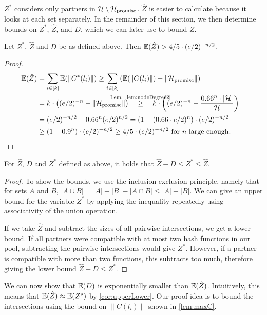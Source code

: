 \documentclass[a4paper,USenglish,cleveref]{lipics-v2021}
\def\refRelLem#1#2{\stackrel{\mathclap{\text{Lem. \ref{#1}}}}{#2}\quad}
\begin{document}
$Z^*$ considers only partners in $\mathcal{H}\setminus\mathcal{H}_{\textrm{promisc}}$.
$\hat Z$ is easier to calculate because it looks at each set separately.
In the remainder of this section, we then determine bounds on $Z^*$, $\hat Z$, and $D$, which we can later use to bound $Z$.

\begin{lemma}
  Let $Z^*$, $\hat Z$ and $D$ be as defined above.
  Then $\mathbb{E}(\hat Z) > 4/5 \cdot (e/2)^{-n/2}$.
  \label{lem:largeZ2}
\end{lemma}
\begin{proof}
  \begin{align*}
    \expect(\hat Z)
     &= \sum_{i \in [k]}\expect(\|C^*(l_i)\|)
     \geq \sum_{i \in [k]}\left(\expect(\|C(l_i)\|) - \|\HProm\|\right)\\
    &= k \cdot \left((e/2)^{-n} - \|\HProm\|\right)
     \quad\refRelLem{lem:nodeDegree2}{\geq} k \cdot \left((e/2)^{-n} - \frac{0.66^n \cdot |\H|}{|\H|}\right)\\
    &= (e/2)^{-n/2} - 0.66^n (e/2)^{n/2}
     = \left(1 - (0.66 \cdot e/2)^n \right) \cdot (e/2)^{-n/2}\\
    & \geq (1-0.9^n) \cdot (e/2)^{-n/2}
      \geq 4/5 \cdot (e/2)^{-n/2} \textrm{ for $n$ large enough.}
    \tag*{\qedhere}
  \end{align*}
\end{proof}

\begin{observation}
  For $\hat Z$, $D$ and $Z^*$ defined as above, it holds that $\hat Z-D \leq Z^* \leq \hat Z$.
  \label{cor:upperLower}
\end{observation}
\begin{proof}
  To show the bounds, we use the inclusion-exclusion principle, namely that for sets $A$ and $B$, $|A \cup B| = |A|+|B| - |A \cap B| \leq |A|+|B|$.
  We can give an upper bound for the variable $Z^*$ by applying the inequality repeatedly using associativity of the union operation.

  If we take $\hat Z$ and subtract the sizes of all pairwise intersections, we get a lower bound.
  If all partners were compatible with at most two hash functions in our pool, subtracting the pairwise intersections would give $Z^*$.
  However, if a partner is compatible with more than two functions, this subtracts too much, therefore giving the lower bound $\hat Z-D \leq Z^*$.
\end{proof}

We can now show that $\mathbb{E}(D)$ is exponentially smaller than $\mathbb{E}(\hat Z)$.
Intuitively, this means that $\mathbb{E}(\hat Z) \approx \mathbb{E}(Z^*)$ by \cref{cor:upperLower}.
Our proof idea is to bound the intersections using the bound on $\|C(l_i)\|$ shown in \cref{lem:maxC}.
\end{document}
